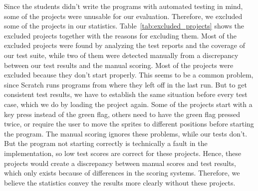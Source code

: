 Since the students didn't write the programs with automated testing in mind,
some of the projects were unusable for our evaluation.
Therefore, we excluded some of the projects in our statistics.
Table~\ref{tab:excluded_projects} shows the excluded projects together with the reasons for excluding them.
Most of the excluded projects were found by analyzing the test reports and the coverage of our test suite,
while two of them were detected manually from a discrepancy between our test results and the manual scoring.
Most of the projects were excluded because they don't start properly.
This seems to be a common problem, since Scratch runs programs from where they left off in the last run.
But to get consistent test results, we have to establish the same situation before every test case,
which we do by loading the project again.
Some of the projects start with a key press instead of the green flag, others need to have the green flag pressed twice,
or require the user to move the sprites to different positions before starting the program.
The manual scoring ignores these problems, while our tests don't.
But the program not starting correctly is technically a fault in the implementation, so low test scores are correct for these projects.
Hence, these projects would create a discrepancy between manual scores and test results,
which only exists because of differences in the scoring systems.
Therefore, we believe the statistics convey the results more clearly without these projects.

